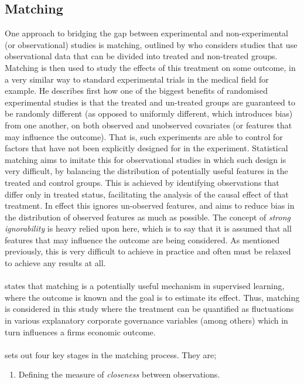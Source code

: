 {\subsection{Matching}\label{matching}
{One approach to bridging the gap between experimental and non-experimental (or observational) studies is matching, outlined by \cite{stuart2010matching} who considers studies that use observational data that can be divided into treated and non-treated groups. Matching is then used to study the effects of this treatment on some outcome, in a very similar way to standard experimental trials in the medical field for example. He describes first how one of the biggest benefits of randomised experimental studies is that the treated and un-treated groups are guaranteed to be randomly different (as opposed to uniformly different, which introduces bias) from one another, on both observed and unobserved covariates (or features that may influence the outcome). That is, such experiments are able to control for factors that have not been explicitly designed for in the experiment. Statistical matching aims to imitate this for observational studies in which such design is very difficult, by balancing the distribution of potentially useful features in the treated and control groups. This is achieved by identifying observations that differ only in treated status, facilitating the analysis of the causal effect of that treatment. In effect this ignores un-observed features, and aims to reduce bias in the distribution of observed features as much as possible. The concept of {\it strong ignorability} is heavy relied upon here, which is to say that it is assumed that all features that may influence the outcome are being considered. As mentioned previously, this is very difficult to achieve in practice and often must be relaxed to achieve any results at all. \\\\
\cite {stuart2010matching} states that matching is a potentially useful mechanism in supervised learning, where the outcome is known and the goal is to estimate its effect. Thus, matching is considered in this study where the treatment can be quantified as fluctuations in various explanatory corporate governance variables (among others) which in turn influences a firms economic outcome. \\\\
\cite {stuart2010matching} sets out four key stages in the matching process. They are;
\begin {enumerate}
\item{Defining the measure of {\it closeness} between observations.}

\end{enumerate}}}
